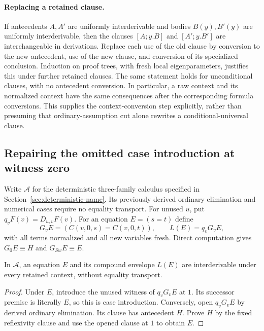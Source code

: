 \paragraph{Replacing a retained clause.}
If antecedents $A,A'$ are uniformly interderivable and bodies $B(y),B'(y)$
are uniformly interderivable, then the clauses $[A;y.B]$ and
$[A';y.B']$ are interchangeable in derivations. Replace each use of the
old clause by conversion to the new antecedent, use of the new clause,
and conversion of its specialized conclusion. Induction on proof trees,
with fresh local eigenparameters, justifies this under further retained
clauses. The same statement holds for unconditional clauses, with no
antecedent conversion. In particular, a raw context and its normalized
context have the same consequences after the corresponding formula
conversions. This supplies the context-conversion step explicitly,
rather than presuming that ordinary-assumption cut alone rewrites a
conditional-universal clause.

\subsection{Repairing the omitted case introduction at witness zero}

Write $\mathcal A$ for the deterministic three-family calculus specified
in Section~\ref{sec:deterministic-name}. Its previously derived ordinary
elimination and numerical cases require no equality transport. For unused
$u$, put $q_v F(v)=D_{u,v}F(v)$. For an equation $E=(s=t)$ define
\[
 G_vE=(C(v,0,s)=C(v,0,t)),\qquad L(E)=q_vG_vE,
\]
with all terms normalized and all new variables fresh. Direct computation
gives $G_0E\equiv H$ and $G_{Sw}E\equiv E$.

\begin{lemma}
\label{lem:nb-envelope}
In $\mathcal A$, an equation $E$ and its compound envelope $L(E)$ are
interderivable under every retained context, without equality transport.
\end{lemma}
\begin{proof}
Under $E$, introduce the unused witness of $q_vG_vE$ at $1$. Its
successor premise is literally $E$, so this is case introduction.
Conversely, open $q_vG_vE$ by derived ordinary elimination. Its clause
has antecedent $H$. Prove $H$ by the fixed reflexivity clause and use
the opened clause at $1$ to obtain $E$.
\end{proof}

